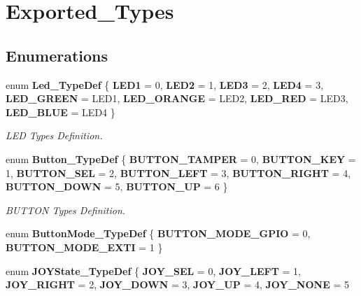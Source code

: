 \section{Exported\+\_\+\+Types}
\label{group___exported___types}
\subsection*{Enumerations}
\begin{DoxyCompactItemize}
\item 
enum \textbf{ Led\+\_\+\+Type\+Def} \{ \newline
\textbf{ L\+E\+D1} = 0, 
\textbf{ L\+E\+D2} = 1, 
\textbf{ L\+E\+D3} = 2, 
\textbf{ L\+E\+D4} = 3, 
\newline
\textbf{ L\+E\+D\+\_\+\+G\+R\+E\+EN} = L\+E\+D1, 
\textbf{ L\+E\+D\+\_\+\+O\+R\+A\+N\+GE} = L\+E\+D2, 
\textbf{ L\+E\+D\+\_\+\+R\+ED} = L\+E\+D3, 
\textbf{ L\+E\+D\+\_\+\+B\+L\+UE} = L\+E\+D4
 \}
\begin{DoxyCompactList}\small\item\em L\+ED Types Definition. \end{DoxyCompactList}\item 
enum \textbf{ Button\+\_\+\+Type\+Def} \{ \newline
\textbf{ B\+U\+T\+T\+O\+N\+\_\+\+T\+A\+M\+P\+ER} = 0, 
\textbf{ B\+U\+T\+T\+O\+N\+\_\+\+K\+EY} = 1, 
\textbf{ B\+U\+T\+T\+O\+N\+\_\+\+S\+EL} = 2, 
\textbf{ B\+U\+T\+T\+O\+N\+\_\+\+L\+E\+FT} = 3, 
\newline
\textbf{ B\+U\+T\+T\+O\+N\+\_\+\+R\+I\+G\+HT} = 4, 
\textbf{ B\+U\+T\+T\+O\+N\+\_\+\+D\+O\+WN} = 5, 
\textbf{ B\+U\+T\+T\+O\+N\+\_\+\+UP} = 6
 \}
\begin{DoxyCompactList}\small\item\em B\+U\+T\+T\+ON Types Definition. \end{DoxyCompactList}\item 
enum \textbf{ Button\+Mode\+\_\+\+Type\+Def} \{ \textbf{ B\+U\+T\+T\+O\+N\+\_\+\+M\+O\+D\+E\+\_\+\+G\+P\+IO} = 0, 
\textbf{ B\+U\+T\+T\+O\+N\+\_\+\+M\+O\+D\+E\+\_\+\+E\+X\+TI} = 1
 \}
\item 
enum \textbf{ J\+O\+Y\+State\+\_\+\+Type\+Def} \{ \newline
\textbf{ J\+O\+Y\+\_\+\+S\+EL} = 0, 
\textbf{ J\+O\+Y\+\_\+\+L\+E\+FT} = 1, 
\textbf{ J\+O\+Y\+\_\+\+R\+I\+G\+HT} = 2, 
\textbf{ J\+O\+Y\+\_\+\+D\+O\+WN} = 3, 
\newline
\textbf{ J\+O\+Y\+\_\+\+UP} = 4, 
\textbf{ J\+O\+Y\+\_\+\+N\+O\+NE} = 5

\end{DoxyCompactItemize}
